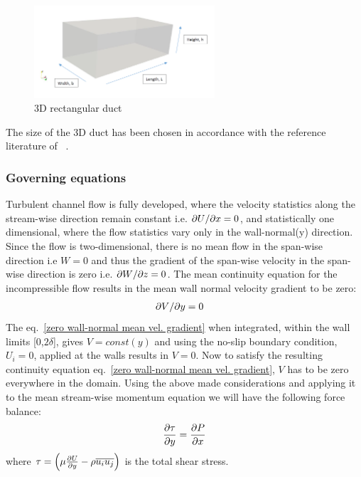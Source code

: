 %
\begin{figure}[h]
    \centering
    \includegraphics[width=0.6\textwidth]{figur/3D_Domain.png}
    \caption{3D rectangular duct}
    \label{3D domain}
\end{figure}
%
The size of the 3D duct has been chosen in accordance with the reference literature of ~\cite{moser:kim:mansour:99}.

\subsubsection{Governing equations}

Turbulent channel flow is fully developed, where the velocity statistics along the stream-wise direction remain constant i.e. ${\partial U}/{\partial x}=0 $, and statistically one dimensional, where the flow statistics vary only in the wall-normal(y) direction. Since the flow is two-dimensional, there is no mean flow in the span-wise direction i.e $W=0$ and thus the gradient of the span-wise velocity in the span-wise direction is zero i.e. ${\partial W}/{\partial z}=0 $. The mean continuity equation for the incompressible flow results in the mean wall normal velocity gradient to be zero:
\begin{equation}
\label{zero wall-normal mean vel. gradient}
\begin{split}
{\partial V}/{\partial y}&=0
\end{split}
\end{equation}
The eq.~\ref{zero wall-normal mean vel. gradient} when integrated, within the wall limits [0,$2\delta$], gives $V=const(y)$ and using the no-slip boundary condition, $U_i = 0$, applied at the walls results in $V = 0$. Now to satisfy the resulting continuity equation eq.~\ref{zero wall-normal mean vel. gradient}, $V$ has to be zero everywhere in the domain. Using the above made considerations and applying it to the mean stream-wise momentum equation we will have the following force balance:
\begin{equation}
\label{Forces channel flow}
\frac{\partial \tau}{\partial y} = \frac{\partial P}{\partial x}\\
\end{equation}
where $\tau = \left(\mu \frac{\partial U}{\partial y} - \rho\overline{u_iu_j}\right)$ is the total shear stress.\\

